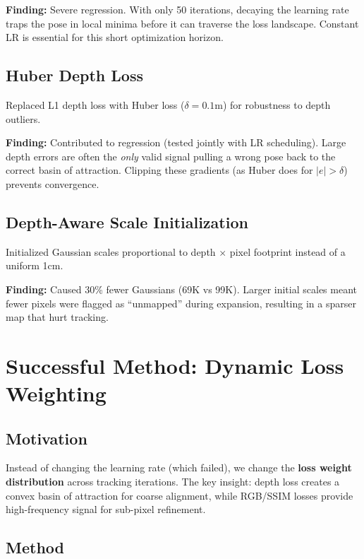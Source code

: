 \documentclass[10pt,twocolumn]{article}
\begin{document}
\textbf{Finding:} \textcolor{regressed}{Severe regression.} With only 50 iterations, decaying the learning rate traps the pose in local minima before it can traverse the loss landscape. Constant LR is essential for this short optimization horizon.

\subsection{Huber Depth Loss}

Replaced L1 depth loss with Huber loss ($\delta=0.1$m) for robustness to depth outliers.

\textbf{Finding:} \textcolor{regressed}{Contributed to regression} (tested jointly with LR scheduling). Large depth errors are often the \emph{only} valid signal pulling a wrong pose back to the correct basin of attraction. Clipping these gradients (as Huber does for $|e| > \delta$) prevents convergence.

\subsection{Depth-Aware Scale Initialization}

Initialized Gaussian scales proportional to depth $\times$ pixel footprint instead of a uniform 1cm.

\textbf{Finding:} \textcolor{regressed}{Caused 30\% fewer Gaussians} (69K vs 99K). Larger initial scales meant fewer pixels were flagged as ``unmapped'' during expansion, resulting in a sparser map that hurt tracking.

\section{Successful Method: Dynamic Loss Weighting}

\subsection{Motivation}

Instead of changing the learning rate (which failed), we change the \textbf{loss weight distribution} across tracking iterations. The key insight: depth loss creates a convex basin of attraction for coarse alignment, while RGB/SSIM losses provide high-frequency signal for sub-pixel refinement.

\subsection{Method}
\end{document}

